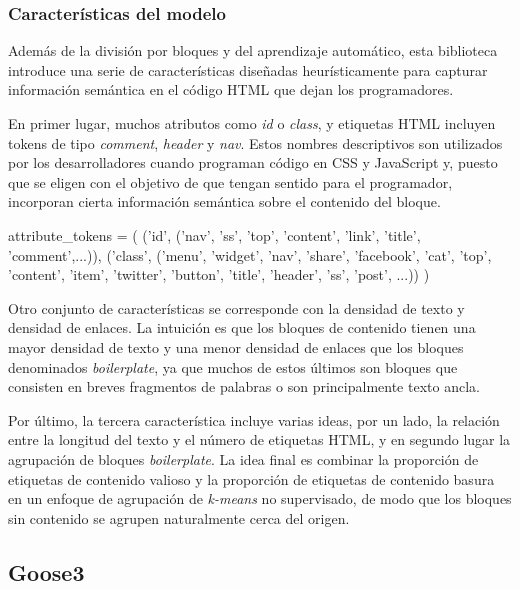 \subsubsection{Características del modelo}
\label{subsubsec:carcateristicas del modelo}

Además de la división por bloques y del aprendizaje automático, esta biblioteca introduce una serie de 
características diseñadas heurísticamente para capturar información semántica en el código HTML que dejan
los programadores. 

En primer lugar, muchos atributos como \emph{id} o \emph{class}, y etiquetas HTML incluyen tokens de tipo 
\emph{comment}, \emph{header} y \emph{nav}. Estos nombres descriptivos son utilizados por los desarrolladores 
cuando programan código en CSS y JavaScript y, puesto que se eligen con el objetivo de que tengan sentido 
para el programador, incorporan cierta información semántica sobre el contenido del bloque.

\begin{Schunk}
  \begin{Soutput}
    attribute_tokens = (
      ('id',
        ('nav', 'ss', 'top', 'content', 'link', 'title', 'comment',...)),
      ('class',
        ('menu', 'widget', 'nav', 'share', 'facebook', 'cat', 'top', 'content',
        'item', 'twitter', 'button', 'title', 'header', 'ss', 'post', ...))
    )
  \end{Soutput}
\end{Schunk}

Otro conjunto de características se corresponde con la densidad de texto y densidad de enlaces. La intuición 
es que los bloques de contenido tienen una mayor densidad de texto y una menor densidad de enlaces que los 
bloques denominados \emph{boilerplate}, ya que muchos de estos últimos son bloques que consisten en breves
fragmentos de palabras o son principalmente texto ancla.

Por último, la tercera característica incluye varias ideas, por un lado, la relación entre la longitud del
texto y el número de etiquetas HTML, y en segundo lugar la agrupación de bloques \emph{boilerplate}. La 
idea final es combinar la proporción de etiquetas de contenido valioso y la proporción de etiquetas de 
contenido basura en un enfoque de agrupación de \emph{k-means} no supervisado, de modo que los bloques sin 
contenido se agrupen naturalmente cerca del origen.

\subsection{Goose3}
\label{subsec:goose3}

